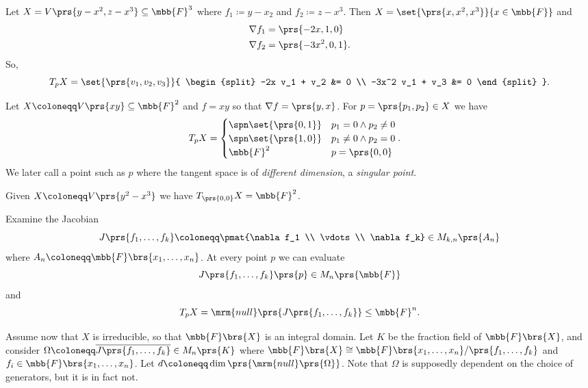 \documentclass[10pt,a4paper,twoside,openany,hidelinks]{book}
\begin{document}
\begin{example}
Let $X = V\prs{y - x^2, z - x^3} \subseteq \mbb{F}^3$ where $f_1 \coloneqq y - x_2$ and $f_2 \coloneqq z - x^3$.
Then $X = \set{\prs{x,x^2,x^3}}{x \in \mbb{F}}$ and
\begin{align*}
\nabla f_1 &= \prs{-2x, 1, 0} \\
\nabla f_2 &= \prs{-3x^2, 0, 1} \text{.}
\end{align*}
So,
\[T_p X = \set{\prs{v_1, v_2, v_3}}{
\begin{split}
-2x v_1 + v_2 &= 0 \\ -3x^2 v_1 + v_3 &= 0
\end{split}
} \text{.}\]
\end{example}

\begin{example}
Let $X \coloneqq V\prs{xy} \subseteq \mbb{F}^2$ and $f = xy$ so that $\nabla f = \prs{y,x}$.
For $p = \prs{p_1, p_2} \in X$ we have
\begin{align*}
T_p X &=
\begin{cases}
\spn\set{\prs{0,1}} & p_1 = 0 \wedge p_2 \neq 0 \\
\spn\set{\prs{1,0}} & p_1 \neq 0 \wedge p_2 = 0 \\
\mbb{F}^2 & p = \prs{0,0}
\end{cases} \text{.}
\end{align*}
We later call a point such as $p$ where the tangent space is of \emph{different dimension}, a \emph{singular point}.
\end{example}

\begin{example}
Given $X \coloneqq V\prs{y^2 - x^3}$ we have $T_{\prs{0,0}}X = \mbb{F}^2$.
\end{example}

Examine the Jacobian
\[J\prs{f_1, \ldots, f_k} \coloneqq \pmat{\nabla f_1 \\ \vdots \\ \nabla f_k} \in M_{k,n}\prs{A_n}\]
where $A_n \coloneqq \mbb{F}\brs{x_1, \ldots, x_n}$.
At every point $p$ we can evaluate
\[J\prs{f_1, \ldots, f_k}\prs{p} \in M_n\prs{\mbb{F}}\]
and
\[T_p X = \mrm{null}\prs{J\prs{f_1, \ldots, f_k}} \leq \mbb{F}^n \text{.}\]

Assume now that $X$ is irreducible, so that $\mbb{F}\brs{X}$ is an integral domain. Let $K$ be the fraction field of $\mbb{F}\brs{X}$, and consider $\Omega \coloneqq \overline{J\prs{f_1, \ldots, f_k}} \in M_n\prs{K}$ where $\mbb{F}\brs{X} \cong \mbb{F}\brs{x_1, \ldots, x_n}/\prs{f_1, \ldots, f_k}$ and $f_i \in \mbb{F}\brs{x_1, \ldots, x_n}$. Let $d \coloneqq \dim\prs{\mrm{null}\prs{\Omega}}$. Note that $\Omega$ is supposedly dependent on the choice of generators, but it is in fact not.
\end{document}
